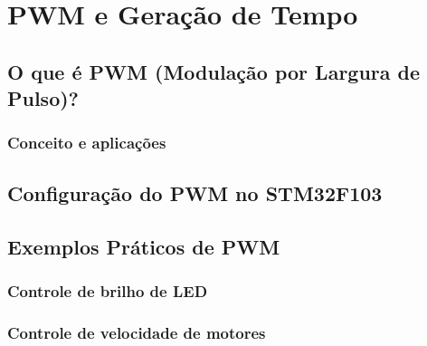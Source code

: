 \section{PWM e Geração de Tempo}

\subsection{O que é PWM (Modulação por Largura de Pulso)?}
\subsubsection{Conceito e aplicações}

\subsection{Configuração do PWM no STM32F103}

\subsection{Exemplos Práticos de PWM}
\subsubsection{Controle de brilho de LED}
\subsubsection{Controle de velocidade de motores}